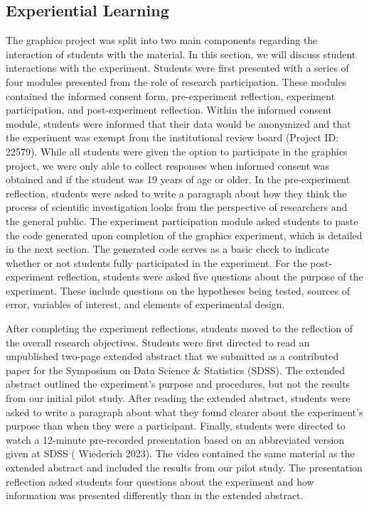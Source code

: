 \documentclass[
  12pt,
]{article}
\providecommand{\DIFdel}[1]{} %
\providecommand{\DIFadd}[1]{{\protect\color{blue} \sf #1}} %
\providecommand{\DIFdel}[1]{{\protect\color{red} [..\footnote{removed: #1} ]}} %
\providecommand{\DIFaddbegin}{} %
\providecommand{\DIFaddend}{} %
\providecommand{\DIFdelbegin}{} %
\providecommand{\DIFdelend}{} %
\newcommand{\DIFscaledelfig}{0.5}
\newlength{\DIFdelgraphicswidth} %
\newlength{\DIFdelgraphicsheight} %
\newcommand{\DIFaddincludegraphics}[2][]{{\color{blue}\fbox{\DIFOincludegraphics[#1]{#2}}}} %
\newcommand{\DIFdelincludegraphics}[2][]{%
\sbox{\DIFdelgraphicsbox}{\DIFOincludegraphics[#1]{#2}}%
\settoboxwidth{\DIFdelgraphicswidth}{\DIFdelgraphicsbox} %
\settoboxtotalheight{\DIFdelgraphicsheight}{\DIFdelgraphicsbox} %
\scalebox{\DIFscaledelfig}{%
\parbox[b]{\DIFdelgraphicswidth}{\usebox{\DIFdelgraphicsbox}\\[-\baselineskip] \rule{\DIFdelgraphicswidth}{0em}}\llap{\resizebox{\DIFdelgraphicswidth}{\DIFdelgraphicsheight}{%
\setlength{\unitlength}{\DIFdelgraphicswidth}%
\begin{picture}(1,1)%
\thicklines\linethickness{2pt} %
{\color[rgb]{1,0,0}\put(0,0){\framebox(1,1){}}}%
{\color[rgb]{1,0,0}\put(0,0){\line( 1,1){1}}}%
{\color[rgb]{1,0,0}\put(0,1){\line(1,-1){1}}}%
\end{picture}%
}\hspace*{3pt}}} %
} %
\DeclareRobustCommand{\DIFaddbegin}{\DIFOaddbegin \let\includegraphics\DIFaddincludegraphics} %
\DeclareRobustCommand{\DIFaddend}{\DIFOaddend \let\includegraphics\DIFOincludegraphics} %
\DeclareRobustCommand{\DIFdelbegin}{\DIFOdelbegin \let\includegraphics\DIFdelincludegraphics} %
\DeclareRobustCommand{\DIFdelend}{\DIFOaddend \let\includegraphics\DIFOincludegraphics} %
\begin{document}
\subsection{Experiential Learning}\label{experiential-learning}

The graphics project was split into two main components regarding the
interaction of students with the material. In this section, we will
discuss student interactions with the experiment. Students were first
presented with a series of four modules presented from the role of
research participation. These modules contained the informed consent
form, pre-experiment reflection, experiment participation, and
post-experiment reflection. Within the informed consent module, students
were informed that their data would be anonymized and that the
experiment was \DIFdelbegin \DIFdel{carried out in accordance with }\DIFdelend \DIFaddbegin \DIFadd{exempt from }\DIFaddend the institutional review board (Project ID:
22579). While all students were given the option to participate in the
graphics project, we were only able to collect responses when informed
consent was obtained and if the student was 19 years of age \DIFaddbegin \DIFadd{or older}\DIFaddend . In
the pre-experiment reflection, students were asked to write a paragraph
about how they think the process of scientific investigation looks from
the perspective of researchers and the general public. The experiment
participation module asked students to paste the code generated upon
completion of the graphics experiment, which is detailed in the next
section. The generated code serves as a basic check to indicate whether
or not students fully participated in the experiment. For the
post-experiment reflection, students were asked five questions about the
purpose of the experiment. These include questions on the hypotheses
being tested, sources of error, variables of interest, and elements of
experimental design.

After completing the experiment reflections, students moved to the
reflection of the overall research objectives. Students were first
directed to read an unpublished two-page extended abstract that we
submitted as a contributed paper for the Symposium on Data Science \&
Statistics (SDSS). The extended abstract outlined the experiment's
purpose and procedures, but not the results from our initial pilot
study. After reading the extended abstract, students were asked to write
a paragraph about what they found clearer about the experiment's purpose
than when they were a participant. Finally, students were directed to
watch a 12-minute pre-recorded presentation based on an abbreviated
version given at SDSS (\DIFdelbegin \DIFdel{\mbox{%
\citeproc{ref-wiederich2023}{Wiederich 2023}}\hskip0pt%
}\DIFdelend \DIFaddbegin \DIFadd{Wiederich 2023}\DIFaddend ). The video contained the same
material as the extended abstract and included the results from our
pilot study. The presentation reflection asked students four questions
about the experiment and how information was presented differently than
in the extended abstract.
\end{document}
